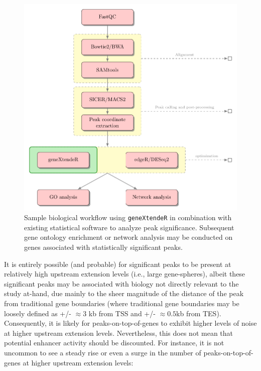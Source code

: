 \documentclass[12pt]{article}
\begin{document}
\begin{figure}[H]
\centering
\includegraphics{figures/workflow.pdf}
\caption{Sample biological workflow using \texttt{geneXtendeR} in combination with existing statistical software to analyze peak significance.  Subsequent gene ontology enrichment or network analysis may be conducted on genes associated with statistically significant peaks.}
\end{figure}

It is entirely possible (and probable) for significant peaks to be present at relatively high upstream extension levels (i.e., large gene-spheres), albeit these significant peaks may be associated with biology not directly relevant to the study at-hand, due mainly to the sheer magnitude of the distance of the peak from traditional gene boundaries (where traditional gene boundaries may be loosely defined as +/- $\approx 3$ kb from TSS and +/- $\approx 0.5$kb from TES).  Consequently, it is likely for peaks-on-top-of-genes to exhibit higher levels of noise at higher upstream extension levels.  Nevertheless, this does not mean that potential enhancer activity should be discounted.  For instance, it is not uncommon to see a steady rise or even a surge in the number of peaks-on-top-of-genes at higher upstream extension levels:
\end{document}
